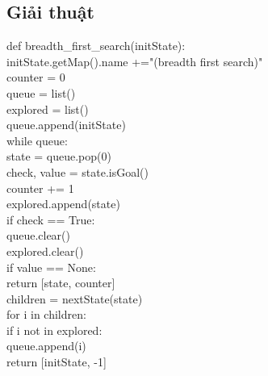 \documentclass[a4paper]{article}
\begin{document}
\subsection{Giải thuật}
\begin{flushleft}
	\hspace{2 cm}	def breadth\_first\_search(initState):\\
	\hspace{3 cm}	initState.getMap().name +="(breadth first search)"\\
	\hspace{3 cm}	counter = 0\\
	\hspace{3 cm}	queue = list()\\
	\hspace{3 cm}	explored = list()\\
	\hspace{3 cm}	queue.append(initState)\\
	\hspace{3 cm}	while queue:\\
	\hspace{4 cm}	state = queue.pop(0)\\
	\hspace{4 cm}	check, value = state.isGoal()\\
	\hspace{4 cm}	counter += 1\\
	\hspace{4 cm}	explored.append(state)\\
	\hspace{4 cm}	if check == True:\\
	\hspace{5 cm}	queue.clear()\\
	\hspace{5 cm}	explored.clear()\\
	\hspace{5 cm}	if value == None:\\
	\hspace{6 cm}	return [state, counter]\\
	\hspace{4 cm}	children = nextState(state)\\
	\hspace{4 cm}	for i in children:\\
	\hspace{5 cm}	if i not in explored:\\
	\hspace{6 cm}	queue.append(i)\\
	\hspace{3 cm}	return [initState, -1]\\
\end{flushleft}
\newpage
\end{document}
